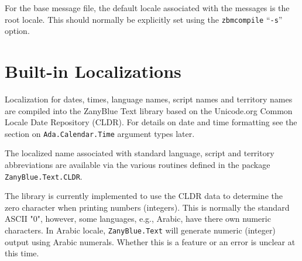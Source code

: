 For the base message file, the default locale associated with the messages
is the root locale.  This should normally be explicitly set using the
\texttt{zbmcompile} ``\texttt{-s}'' option.

\section{Built-in Localizations}

Localization for dates, times, language names, script names and territory
names are compiled into the ZanyBlue Text library based on the Unicode.org
Common Locale Date Repository (CLDR).  For details on date and time formatting
see the section on \texttt{Ada.Calendar.Time} argument types later.

The localized name associated with standard language, script and territory
abbreviations are available via the various routines defined in the package
\texttt{ZanyBlue.Text.CLDR}.

The library is currently implemented to use the CLDR data to determine the
zero character when printing numbers (integers).  This is normally the
standard ASCII "0", however, some languages, e.g., Arabic, have there own
numeric characters.  In Arabic locale, \texttt{ZanyBlue.Text} will generate
numeric (integer) output using Arabic numerals.  Whether this is a feature
or an error is unclear at this time.

